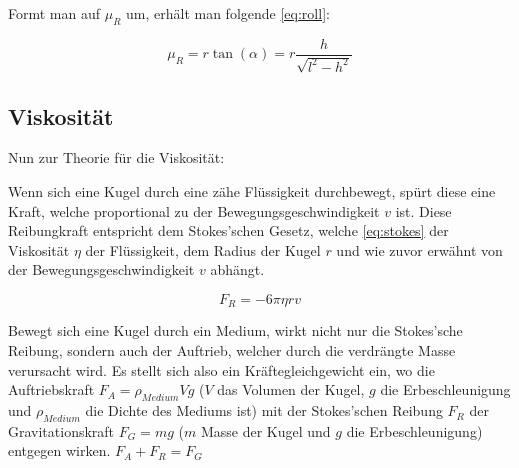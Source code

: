 \documentclass[11pt,ngerman]{scrartcl}
\begin{document}
Formt man auf $\mu_R$ um, erhält man folgende \autoref{eq:roll}:

\begin{equation}
    \mu_R = r \tan(\alpha) = r \frac{h}{\sqrt{l^2-h^2}}  \label{eq:roll}
\end{equation}


%
%
%
%
%
%
%
%
%
%

\subsection{Viskosität}

Nun zur Theorie für die Viskosität:

Wenn sich eine Kugel durch eine zähe Flüssigkeit durchbewegt, spürt diese 
eine Kraft, welche proportional zu der Bewegungsgeschwindigkeit $v$ ist.
Diese Reibungkraft entspricht dem Stokes'schen Gesetz, welche \autoref{eq:stokes}
der Viskosität $\eta$ der Flüssigkeit, dem Radius der Kugel $r$ und 
wie zuvor erwähnt von der Bewegungsgeschwindigkeit $v$ abhängt.

\begin{equation}
    F_R = -6\pi\eta r v \label{eq:stokes}
\end{equation}

Bewegt sich eine Kugel durch ein Medium, wirkt nicht nur die Stokes'sche Reibung,
sondern auch der Auftrieb, welcher durch die verdrängte Masse verursacht wird.
Es stellt sich also ein Kräftegleichgewicht ein, wo die Auftriebskraft
$F_A=\rho_{Medium}Vg$ ($V$ das Volumen der Kugel, $g$ die Erbeschleunigung und
$\rho_{Medium}$ die Dichte des Mediums ist) mit der Stokes'schen Reibung $F_R$
der Gravitationskraft $F_G=mg$ ($m$ Masse der Kugel und $g$ die
Erbeschleunigung) entgegen wirken.
$F_A + F_R = F_G$
\end{document}
